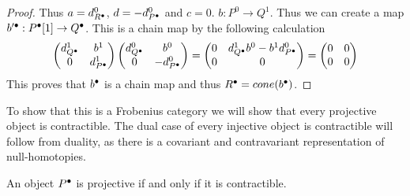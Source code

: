 \begin{proof}
        Thus $a = d^0_{R^{\bullet}}$, $d = -d^0_{P^{\bullet}}$ and $c=0$. $b:P^0\rightarrow Q^1$. Thus we can create a map $b'^{\bullet}:P^{\bullet}[1]\rightarrow Q^{\bullet}$. This is a chain map by the following calculation
        \begin{equation*}
            \begin{pmatrix} d^1_{Q^{\bullet}} & b^1 \\ 0 & d^1_{P^{\bullet}} \end{pmatrix}\begin{pmatrix} d^0_{Q^{\bullet}} & b^0 \\ 0 & -d^0_{P^{\bullet}} \end{pmatrix} = \begin{pmatrix} 0 & d^1_{Q^{\bullet}}b^0 - b^1d^0_{P^{\bullet}} \\ 0 & 0 \end{pmatrix} = \begin{pmatrix} 0 & 0 \\ 0 & 0 \end{pmatrix}
        \end{equation*}
        This proves that $b^{\bullet}$ is a chain map and thus $R^{\bullet}=cone(b^{\bullet})$.
    \end{proof}

    To show that this is a Frobenius category we will show that every projective object is contractible. The dual case of every injective object is contractible will follow from duality, as there is a covariant and contravariant representation of null-homotopies.

    \begin{prop}
        An object $P^{\bullet}$ is projective if and only if it is contractible.
    \end{prop}

